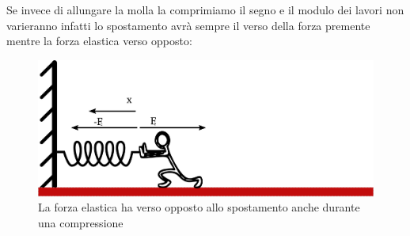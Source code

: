 \documentclass[a4paper,10pt,oneside]{article}
\begin{document}
Se invece di allungare la molla la comprimiamo il segno e il modulo dei lavori non varieranno infatti lo spostamento avrà sempre il verso della forza premente mentre la forza elastica verso opposto:
\begin{figure}[H]
 \centering
 \includegraphics[width=\textwidth]{./immagini/lavoro_molla2.png}
 \caption{La forza elastica ha verso opposto allo spostamento anche durante una compressione}
 \label{fig:compressione_molla}
\end{figure}
\end{document}

